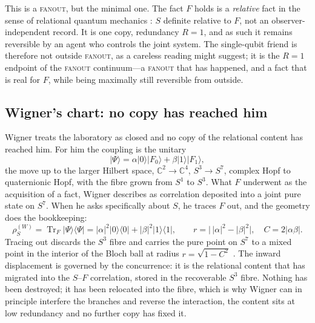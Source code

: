 \documentclass{article}
\begin{document}
This is a \textsc{fanout}, but the minimal one. The fact $F$ holds is a
\emph{relative} fact in the sense of relational quantum mechanics
\autocite{Rovelli1996a}: $S$ definite relative to $F$, not an observer-independent
record. It is one copy, redundancy $R=1$, and as such it remains reversible by an
agent who controls the joint system. The single-qubit friend is therefore not
outside \textsc{fanout}, as a careless reading might suggest; it is the $R=1$
endpoint of the \textsc{fanout} continuum---a \textsc{fanout} that has happened,
and a fact that is real for $F$, while being maximally still reversible from
outside.
\subsection{Wigner's chart: no copy has reached him}
\label{sec:wf-wigner}

Wigner treats the laboratory as closed and no copy of the relational content has
reached him. For him the coupling is the unitary
\begin{equation}
  \lvert\Psi\rangle
  =\alpha\lvert 0\rangle\lvert F_{0}\rangle
  +\beta\lvert 1\rangle\lvert F_{1}\rangle,
\end{equation}
the move up to the larger Hilbert space, $\mathbb{C}^{2}\to\mathbb{C}^{4}$,
$S^{3}\to S^{7}$, complex Hopf to quaternionic Hopf, with the fibre grown from
$S^{1}$ to $S^{3}$. What $F$ underwent as the acquisition of a fact, Wigner
describes as correlation deposited into a joint pure state on $S^{7}$. When he
asks specifically about $S$, he traces $F$ out, and the geometry does the
bookkeeping:
\begin{equation}
  \rho_{S}^{(W)}=\operatorname{Tr}_{F}\lvert\Psi\rangle\langle\Psi\rvert
  =\lvert\alpha\rvert^{2}\lvert 0\rangle\langle 0\rvert
  +\lvert\beta\rvert^{2}\lvert 1\rangle\langle 1\rvert,
  \qquad
  r=\bigl\lvert\,\lvert\alpha\rvert^{2}-\lvert\beta\rvert^{2}\bigr\rvert,
  \quad
  C=2\lvert\alpha\beta\rvert .
\end{equation}
Tracing out discards the $S^{3}$ fibre and carries the pure point on $S^{7}$ to a
mixed point in the interior of the Bloch ball at radius $r=\sqrt{1-C^{2}}$
\autocite{MosseriDandoloff2001}. The inward displacement is governed by the
concurrence: it is the relational content that has migrated into the $S$--$F$
correlation, stored in the recoverable $S^{3}$ fibre. Nothing has been destroyed;
it has been relocated into the fibre, which is why Wigner can in principle
interfere the branches and reverse the interaction, the content sits at low
redundancy and no further copy has fixed it.
\end{document}
